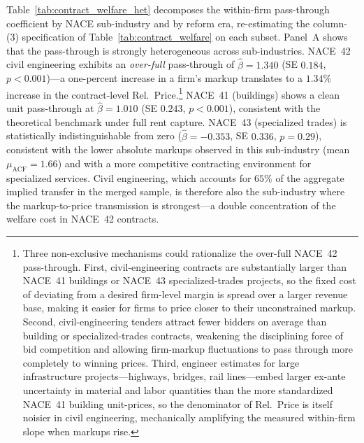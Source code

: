 \documentclass[11pt]{article}
\begin{document}
Table~\ref{tab:contract_welfare_het} decomposes the within-firm pass-through coefficient by NACE sub-industry and by reform era, re-estimating the column-(3) specification of Table~\ref{tab:contract_welfare} on each subset. Panel~A shows that the pass-through is strongly heterogeneous across sub-industries. NACE~42 civil engineering exhibits an \emph{over-full} pass-through of $\hat\beta = 1.340$ (SE $0.184$, $p < 0.001$)---a one-percent increase in a firm's markup translates to a $1.34\%$ increase in the contract-level Rel.\ Price.\footnote{Three non-exclusive mechanisms could rationalize the over-full NACE~42 pass-through. First, civil-engineering contracts are substantially larger than NACE~41 buildings or NACE~43 specialized-trades projects, so the fixed cost of deviating from a desired firm-level margin is spread over a larger revenue base, making it easier for firms to price closer to their unconstrained markup. Second, civil-engineering tenders attract fewer bidders on average than building or specialized-trades contracts, weakening the disciplining force of bid competition and allowing firm-markup fluctuations to pass through more completely to winning prices. Third, engineer estimates for large infrastructure projects---highways, bridges, rail lines---embed larger ex-ante uncertainty in material and labor quantities than the more standardized NACE~41 building unit-prices, so the denominator of Rel.\ Price is itself noisier in civil engineering, mechanically amplifying the measured within-firm slope when markups rise.} NACE~41 (buildings) shows a clean unit pass-through at $\hat\beta = 1.010$ (SE $0.243$, $p < 0.001$), consistent with the theoretical benchmark under full rent capture. NACE~43 (specialized trades) is statistically indistinguishable from zero ($\hat\beta = -0.353$, SE $0.336$, $p = 0.29$), consistent with the lower absolute markups observed in this sub-industry (mean $\mu_{\text{ACF}} = 1.66$) and with a more competitive contracting environment for specialized services. Civil engineering, which accounts for $65\%$ of the aggregate implied transfer in the merged sample, is therefore also the sub-industry where the markup-to-price transmission is strongest---a double concentration of the welfare cost in NACE~42 contracts.
\end{document}
